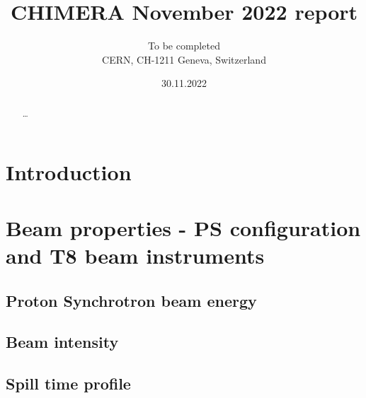 \documentclass{cernatsnote}
\title{CHIMERA November 2022 report}
\author{
    	To be completed \; \\		
    	CERN, CH-1211 Geneva, Switzerland
    }
\date{30.11.2022}
\begin{document}
    \newcommand{\figref}[1]{Fig.\,\ref{#1}}
    \newcommand{\tabref}[1]{Table\,\ref{#1}}
    \newcommand{\secref}[1]{Section\,\ref{#1}}

    \maketitle
    
    \begin{abstract}
        \ldots
    \end{abstract}

    \begingroup
    \color{black}
    \pagebreak
    \tableofcontents
    \endgroup

\pagebreak

\section{Introduction} %


\section{Beam properties - PS configuration and T8 beam instruments}

\subsection{Proton Synchrotron beam energy} %


\subsection{Beam intensity} %



\subsection{Spill time profile} %

\end{document}
